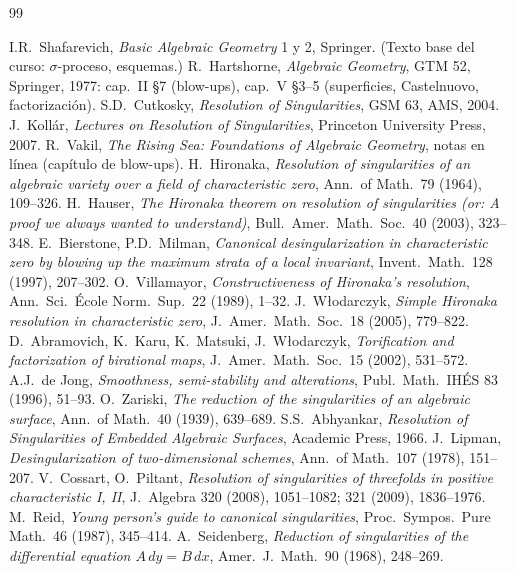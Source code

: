 \documentclass[11pt,a4paper,oneside]{book}
\theoremstyle{plain}
\theoremstyle{definition}
\theoremstyle{remark}
\begin{document}
\backmatter
\nocite{*}
\begin{thebibliography}{99}
 I.R.~Shafarevich, \emph{Basic Algebraic Geometry} 1 y 2, Springer. (Texto base del curso: $\sigma$-proceso, esquemas.)
 R.~Hartshorne, \emph{Algebraic Geometry}, GTM 52, Springer, 1977: cap.~II \S7 (blow-ups), cap.~V \S3--5 (superficies, Castelnuovo, factorización).
 S.D.~Cutkosky, \emph{Resolution of Singularities}, GSM 63, AMS, 2004.
 J.~Kollár, \emph{Lectures on Resolution of Singularities}, Princeton University Press, 2007.
 R.~Vakil, \emph{The Rising Sea: Foundations of Algebraic Geometry}, notas en línea (capítulo de blow-ups).
 H.~Hironaka, \emph{Resolution of singularities of an algebraic variety over a field of characteristic zero}, Ann.\ of Math.\ 79 (1964), 109--326.
 H.~Hauser, \emph{The Hironaka theorem on resolution of singularities (or: A proof we always wanted to understand)}, Bull.\ Amer.\ Math.\ Soc.\ 40 (2003), 323--348.
 E.~Bierstone, P.D.~Milman, \emph{Canonical desingularization in characteristic zero by blowing up the maximum strata of a local invariant}, Invent.\ Math.\ 128 (1997), 207--302.
 O.~Villamayor, \emph{Constructiveness of Hironaka's resolution}, Ann.\ Sci.\ École Norm.\ Sup.\ 22 (1989), 1--32.
 J.~Włodarczyk, \emph{Simple Hironaka resolution in characteristic zero}, J.\ Amer.\ Math.\ Soc.\ 18 (2005), 779--822.
 D.~Abramovich, K.~Karu, K.~Matsuki, J.~Włodarczyk, \emph{Torification and factorization of birational maps}, J.\ Amer.\ Math.\ Soc.\ 15 (2002), 531--572.
 A.J.~de Jong, \emph{Smoothness, semi-stability and alterations}, Publ.\ Math.\ IHÉS 83 (1996), 51--93.
 O.~Zariski, \emph{The reduction of the singularities of an algebraic surface}, Ann.\ of Math.\ 40 (1939), 639--689.
 S.S.~Abhyankar, \emph{Resolution of Singularities of Embedded Algebraic Surfaces}, Academic Press, 1966.
 J.~Lipman, \emph{Desingularization of two-dimensional schemes}, Ann.\ of Math.\ 107 (1978), 151--207.
 V.~Cossart, O.~Piltant, \emph{Resolution of singularities of threefolds in positive characteristic I, II}, J.\ Algebra 320 (2008), 1051--1082; 321 (2009), 1836--1976.
 M.~Reid, \emph{Young person's guide to canonical singularities}, Proc.\ Sympos.\ Pure Math.\ 46 (1987), 345--414.
 A.~Seidenberg, \emph{Reduction of singularities of the differential equation $A\,dy=B\,dx$}, Amer.\ J.\ Math.\ 90 (1968), 248--269.

\end{thebibliography}
\end{document}
